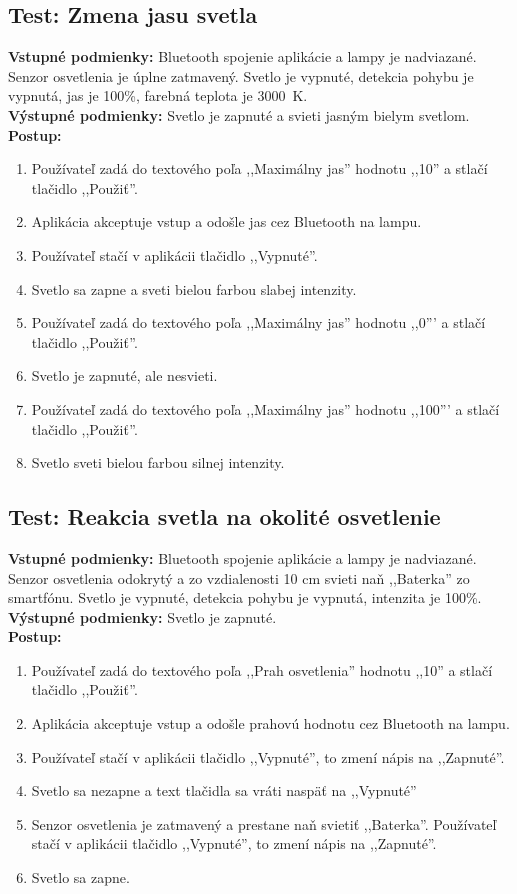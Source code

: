 \documentclass[12pt, a4paper]{article}
\begin{document}
\subsection{Test: Zmena jasu svetla}
\noindent\textbf{Vstupné podmienky:} Bluetooth spojenie aplikácie a lampy je nadviazané. Senzor osvetlenia je úplne zatmavený. Svetlo je vypnuté, detekcia pohybu je vypnutá, jas je 100\%, farebná teplota je 3000~K. \\
\textbf{Výstupné podmienky:} Svetlo je zapnuté a svieti jasným bielym svetlom. \\
\textbf{Postup:}
\begin{enumerate}
\itemsep0pt
\item Používateľ zadá do textového poľa ,,Maximálny jas'' hodnotu ,,10'' a stlačí tlačidlo ,,Použiť''.
\item Aplikácia akceptuje vstup a odošle jas cez Bluetooth na lampu.
\item Používateľ stačí v aplikácii tlačidlo ,,Vypnuté''.
\item Svetlo sa zapne a sveti bielou farbou slabej intenzity.
\item Používateľ zadá do textového poľa ,,Maximálny jas'' hodnotu ,,0''' a stlačí tlačidlo ,,Použiť''.
\item Svetlo je zapnuté, ale nesvieti.
\item Používateľ zadá do textového poľa ,,Maximálny jas'' hodnotu ,,100''' a stlačí tlačidlo ,,Použiť''.
\item Svetlo sveti bielou farbou silnej intenzity.
\end{enumerate}

\subsection{Test: Reakcia svetla na okolité osvetlenie}
\noindent\textbf{Vstupné podmienky:} Bluetooth spojenie aplikácie a lampy je nadviazané. Senzor osvetlenia odokrytý a zo vzdialenosti 10 cm svieti naň ,,Baterka'' zo smartfónu. Svetlo je vypnuté, detekcia pohybu je vypnutá, intenzita je 100\%.
\textbf{Výstupné podmienky:} Svetlo je zapnuté. \\
\textbf{Postup:}
\begin{enumerate}
\itemsep0pt
\item Používateľ zadá do textového poľa ,,Prah osvetlenia'' hodnotu ,,10'' a stlačí tlačidlo ,,Použiť''.
\item Aplikácia akceptuje vstup a odošle prahovú hodnotu cez Bluetooth na lampu.
\item Používateľ stačí v aplikácii tlačidlo ,,Vypnuté'', to zmení nápis na ,,Zapnuté''.
\item Svetlo sa nezapne a text tlačidla sa vráti naspäť na ,,Vypnuté''
\item Senzor osvetlenia je zatmavený a prestane naň svietiť ,,Baterka''. Používateľ stačí v aplikácii tlačidlo ,,Vypnuté'', to zmení nápis na ,,Zapnuté''.
\item Svetlo sa zapne.
\end{enumerate}
\end{document}
